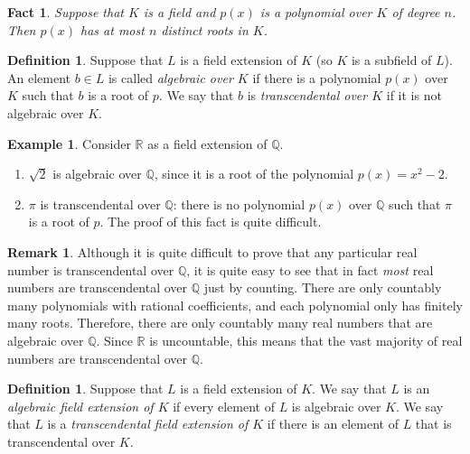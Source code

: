 \documentclass[a4paper]{memoir}
\newtheorem{fact}[theorem]{Fact}
\theoremstyle{definition}
\newtheorem{definition}[theorem]{Definition}
\newtheorem{remark}[theorem]{Remark}
\newtheorem{example}[theorem]{Example}
\newcommand{\bb}{\mathbb}
\begin{document}
\begin{fact} \label{fact: roots}
  Suppose that $K$ is a field and $p(x)$ is a polynomial over $K$ of degree $n$. Then 
  $p(x)$ has at most $n$ distinct roots in $K$.
\end{fact}

\begin{definition}
  Suppose that $L$ is a field extension of $K$ (so $K$ is a subfield of $L$). An element 
  $b \in L$ is called \emph{algebraic over $K$} if there is a polynomial $p(x)$ over 
  $K$ such that $b$ is a root of $p$. We say that $b$ is \emph{transcendental over 
  $K$} if it is not algebraic over $K$.
\end{definition}

\begin{example}
  Consider $\bb{R}$ as a field extension of $\bb{Q}$.
  \begin{enumerate}
    \item $\sqrt{2}$ is algebraic over $\bb{Q}$, since it is a root of the polynomial 
    $p(x) = x^2 - 2$.
    \item $\pi$ is transcendental over $\bb{Q}$: there is no polynomial $p(x)$ over 
    $\bb{Q}$ such that $\pi$ is a root of $p$. The proof of this fact is quite difficult.
  \end{enumerate}
\end{example}

\begin{remark}
  Although it is quite difficult to prove that any particular real number is transcendental over 
  $\bb{Q}$, it is quite easy to see that in fact \emph{most} real numbers are transcendental over 
  $\bb{Q}$ just by counting. There are only countably many polynomials with rational 
  coefficients, and each polynomial only has finitely many roots. Therefore, there are only 
  countably many real numbers that are algebraic over $\bb{Q}$. Since $\bb{R}$ is uncountable, 
  this means that the vast majority of real numbers are transcendental over $\bb{Q}$.
\end{remark}

\begin{definition}
  Suppose that $L$ is a field extension of $K$. We say that $L$ is an \emph{algebraic field 
  extension of $K$} if every element of $L$ is algebraic over $K$. We say that $L$ is a 
  \emph{transcendental field extension of $K$} if there is an element of $L$ that is 
  transcendental over $K$.
\end{definition}
\end{document}
